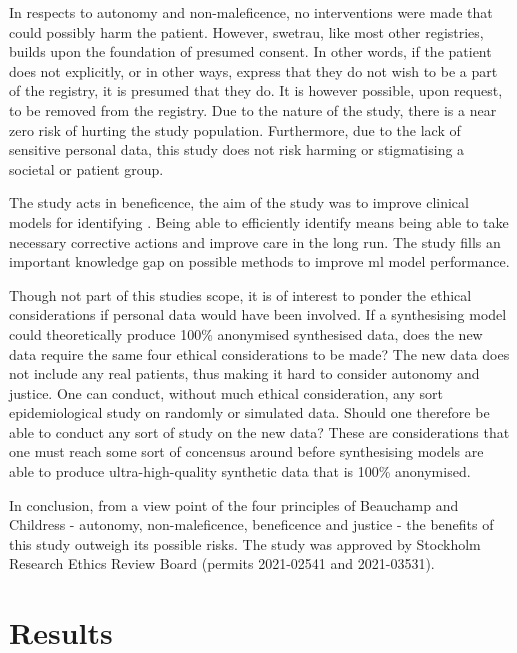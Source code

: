 \documentclass[12pt, letterpaper]{article}
\begin{document}
In respects to autonomy and non-maleficence, no interventions were made that could possibly harm the patient. However, \acrshort{swetrau}, like most other registries, builds upon the foundation of presumed consent. In other words, if the patient does not explicitly, or in other ways, express that they do not wish to be a part of the registry, it is presumed that they do. It is however possible, upon request, to be removed from the registry. Due to the nature of the study, there is a near zero risk of hurting the study population. Furthermore, due to the lack of sensitive personal data, this study does not risk harming or stigmatising a societal or patient group.

The study acts in beneficence, the aim of the study was to improve clinical models for identifying . Being able to efficiently identify  means being able to take necessary corrective actions and improve care in the long run. The study fills an important knowledge gap on possible methods to improve \acrshort{ml} model performance.

Though not part of this studies scope, it is of interest to ponder the ethical considerations if personal data would have been involved. If a synthesising model could theoretically produce 100\% anonymised synthesised data, does the new data require the same four ethical considerations to be made? The new data does not include any real patients, thus making it hard to consider autonomy and justice. One can conduct, without much ethical consideration, any sort epidemiological study on randomly or simulated data. Should one therefore be able to conduct any sort of study on the new data? These are considerations that one must reach some sort of concensus around before synthesising models are able to produce ultra-high-quality synthetic data that is 100\% anonymised.

In conclusion, from a view point of the four principles of Beauchamp and Childress - autonomy, non-maleficence, beneficence and justice - the benefits of this study outweigh its possible risks. The study was approved by Stockholm Research Ethics Review Board (permits 2021-02541 and 2021-03531).

\section{Results}
\end{document}
